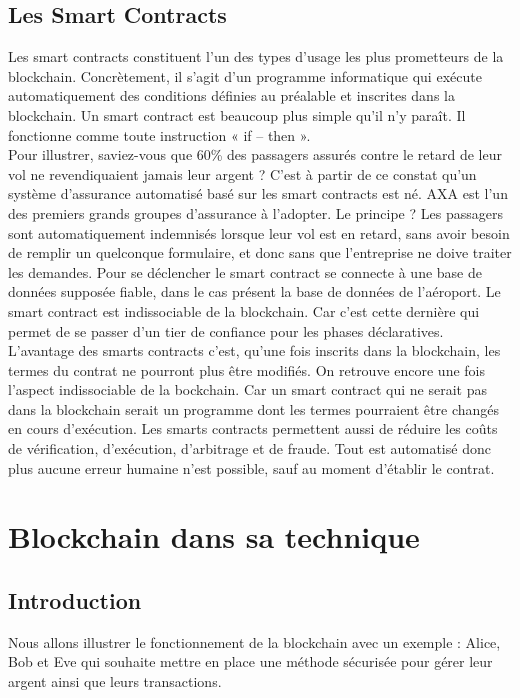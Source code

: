 \documentclass[12pt, a4paper, oneside]{book}
\begin{document}
    \section{Les Smart Contracts}
    Les smart contracts constituent l’un des types d’usage les plus prometteurs de la blockchain. Concrètement, il s’agit d’un programme informatique qui exécute automatiquement des conditions définies au préalable et inscrites dans la blockchain. Un smart contract est beaucoup plus simple qu’il n’y paraît. Il fonctionne comme toute instruction « if – then ». 
    \\
    Pour illustrer, saviez-vous que 60\% des passagers assurés contre le retard de leur vol ne revendiquaient jamais leur argent ? C’est à partir de ce constat qu’un système d’assurance automatisé basé sur les smart contracts est né. AXA est l’un des premiers grands groupes d’assurance à l’adopter. Le principe ? Les passagers sont automatiquement indemnisés lorsque leur vol est en retard, sans avoir besoin de remplir un quelconque formulaire, et donc sans que l’entreprise ne doive traiter les demandes. Pour se déclencher le smart contract se connecte à une base de données supposée fiable, dans le cas présent la base de données de l’aéroport.
    Le smart contract est indissociable de la blockchain. Car c’est cette dernière qui permet de se passer d’un tier de confiance pour les phases déclaratives.
    \\
    L’avantage des smarts contracts c’est, qu’une fois inscrits dans la blockchain, les termes du contrat ne pourront plus être modifiés. On retrouve encore une fois l’aspect indissociable de la bockchain. Car un smart contract qui ne serait pas dans la blockchain serait un programme dont les termes pourraient être changés en cours d’exécution.
    Les smarts contracts permettent aussi de réduire les coûts de vérification, d’exécution, d’arbitrage et de fraude. Tout est automatisé donc plus aucune erreur humaine n’est possible, sauf au moment d’établir le contrat.


    \chapter{Blockchain dans sa technique}
    \section{Introduction}
    Nous allons illustrer le fonctionnement de la blockchain avec un exemple : Alice, Bob et Eve qui souhaite mettre en place une méthode sécurisée pour gérer leur argent ainsi que leurs transactions.
\end{document}
